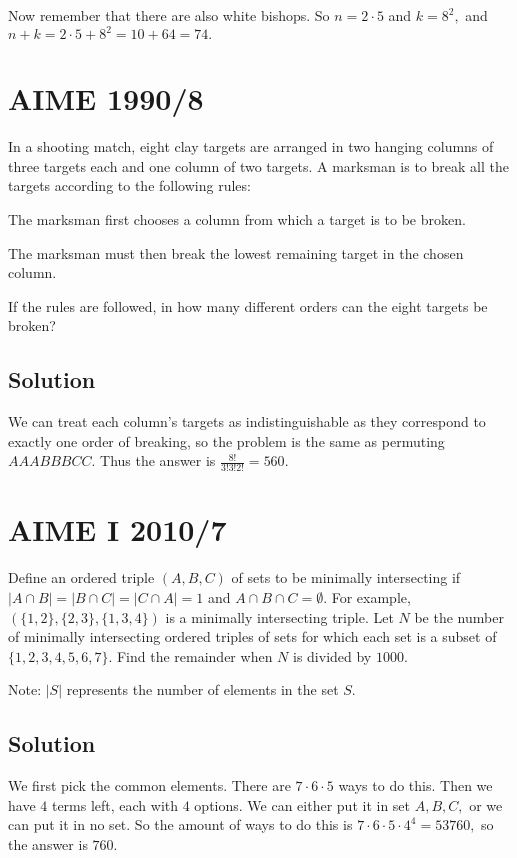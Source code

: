 \documentclass[mast]{lucky}
\begin{document}
Now remember that there are also white bishops. So $n=2\cdot 5$ and $k=8^2,$ and $n+k=2\cdot 5+8^2=10+64=74.$
\pagebreak\section{AIME 1990/8}
In a shooting match, eight clay targets are arranged in two hanging columns of three targets each and one column of two targets. A marksman is to break all the targets according to the following rules:

    \begin{itemize}
         \Item The marksman first chooses a column from which a target is to be broken.

         \Item The marksman must then break the lowest remaining target in the chosen column.
    \end{itemize}

    If the rules are followed, in how many different orders can the eight targets be broken?

\subsection{Solution}

We can treat each column's targets as indistinguishable as they correspond to exactly one order of breaking, so the problem is the same as permuting $AAABBBCC.$ Thus the answer is $\frac{8!}{3!3!2!}=560.$

\pagebreak\section{AIME I 2010/7}

Define an ordered triple $(A, B, C)$ of sets to be minimally intersecting if $|A \cap B| = |B \cap C| = |C \cap A| = 1$ and $ A \cap B \cap C = \emptyset$. For example, $(\{1,2\},\{2,3\},\{1,3,4\})$ is a minimally intersecting triple. Let $N$ be the number of minimally intersecting ordered triples of sets for which each set is a subset of $\{1,2,3,4,5,6,7\}$. Find the remainder when $N$ is divided by $1000$.

Note: $|S|$ represents the number of elements in the set $S.$

\subsection{Solution}
We first pick the common elements. There are $7\cdot 6\cdot 5$ ways to do this. Then we have $4$ terms left, each with $4$ options. We can either put it in set $A,B,C,$ or we can put it in no set. So the amount of ways to do this is $7\cdot 6\cdot 5\cdot 4^4=53760,$ so the answer is $760.$
\end{document}

